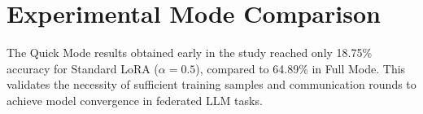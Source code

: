 \appendices
\section{Experimental Mode Comparison}
The Quick Mode results obtained early in the study reached only 18.75\% accuracy for Standard LoRA ($\alpha=0.5$), compared to 64.89\% in Full Mode. This validates the necessity of sufficient training samples and communication rounds to achieve model convergence in federated LLM tasks.

\ifCLASSOPTIONcaptionsoff
  \newpage
\fi







